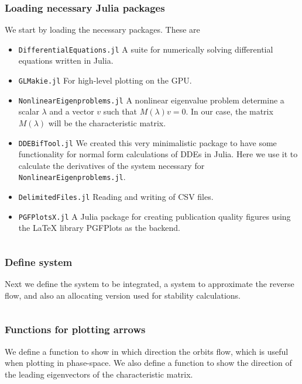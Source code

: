 \subsubsection{Loading necessary Julia packages}
We start by loading the necessary packages. These are
\begin{itemize}
    \item {\tt DifferentialEquations.jl} A suite for numerically solving differential equations written in Julia.
    \item {\tt GLMakie.jl} For high-level plotting on the GPU.
    \item {\tt NonlinearEigenproblems.jl} A nonlinear eigenvalue problem determine a scalar $\lambda$ and a vector $v$ such that $M(\lambda)v=0$. In our case, the matrix $M(\lambda)$ will be the characteristic matrix.
    \item {\tt DDEBifTool.jl} We created this very minimalistic package to have some functionality for normal form calculations of DDEs in Julia. Here we use it to calculate the derivatives of the system necessary for {\tt NonlinearEigenproblems.jl}.
    \item {\tt DelimitedFiles.jl} Reading and writing of CSV files.
    \item {\tt PGFPlotsX.jl} A Julia package for creating publication quality figures using the LaTeX library PGFPlots as the backend.
\end{itemize}
\newcommand\pathToJuliaFiles{simulation}
\inputminted[firstline=1, lastline=8]{julia}{\pathToJuliaFiles/predator_prey_simulation_article.jl}

\subsubsection{Define system}
Next we define the system to be integrated, a system to approximate the reverse
flow, and also an allocating version used for stability calculations.
\inputminted[firstline=10, lastline=38]{julia}{\pathToJuliaFiles/predator_prey_simulation_article.jl}

\subsubsection{Functions for plotting arrows} \label{sm:eq:arrow_functions}
We define a function to show in which direction the orbits flow, which is
useful when plotting in phase-space. We also define a function to show the
direction of the leading eigenvectors of the characteristic matrix.

